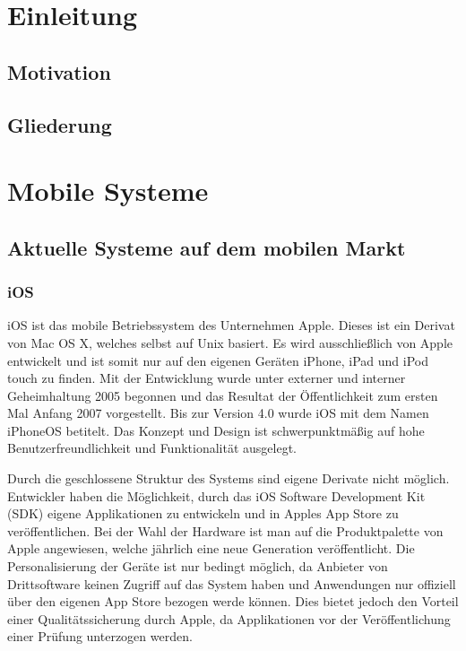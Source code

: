 \section*{\centering\abstractname}



\chapter{Einleitung}

\section{Motivation}
\section{Gliederung}

\chapter{Mobile Systeme}

\section{Aktuelle Systeme auf dem mobilen Markt}

\subsection{iOS}
iOS ist das mobile Betriebssystem des Unternehmen Apple. Dieses ist ein Derivat von Mac OS X, welches selbst auf Unix basiert. Es wird ausschließlich von Apple entwickelt und ist somit nur auf den eigenen Geräten iPhone, iPad und iPod touch zu finden. Mit der Entwicklung wurde unter externer und interner Geheimhaltung 2005 begonnen und das Resultat der Öffentlichkeit zum ersten Mal Anfang 2007 vorgestellt. Bis zur Version 4.0 wurde iOS mit dem Namen iPhoneOS betitelt. Das Konzept und Design ist schwerpunktmäßig auf hohe Benutzerfreundlichkeit und Funktionalität ausgelegt. 

Durch die geschlossene Struktur des Systems sind eigene Derivate nicht möglich. Entwickler haben die Möglichkeit, durch das iOS Software Development Kit (SDK) eigene Applikationen zu entwickeln und in Apples App Store zu veröffentlichen.
Bei der Wahl der Hardware ist man auf die Produktpalette von Apple angewiesen, welche jährlich eine neue Generation veröffentlicht. Die Personalisierung der Geräte ist nur bedingt möglich, da Anbieter von Drittsoftware keinen Zugriff auf das System haben und Anwendungen nur offiziell über den eigenen App Store bezogen werde können. Dies bietet jedoch den Vorteil einer Qualitätssicherung durch Apple, da Applikationen vor der Veröffentlichung einer Prüfung unterzogen werden.
\\

